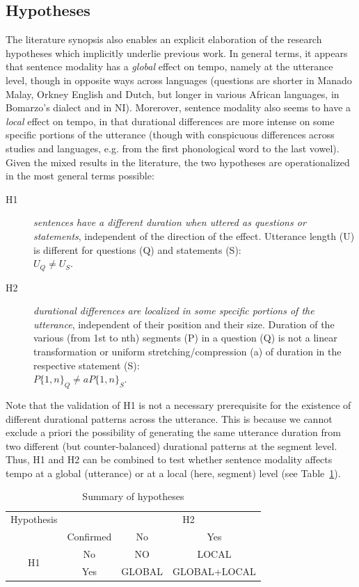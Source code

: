 \subsection{Hypotheses}\label{sec431}
The literature synopsis also enables an explicit elaboration of the research hypotheses which implicitly underlie previous work. In general terms, it appears that sentence modality has a \textit{global} effect on tempo, namely at the utterance level, though in opposite ways across languages (questions are shorter in Manado Malay, Orkney English and Dutch, but longer in various African languages, in Bomarzo's dialect and in NI). Morerover, sentence modality also seems to have a \textit{local} effect on tempo, in that durational differences are more intense on some specific portions of the utterance (though with conspicuous differences across studies and languages, e.g. from the first phonological word to the last vowel). Given the mixed results in the literature, the two hypotheses are operationalized in the most general terms possible: 

\begin{description}
   \item[H1] \textit{sentences have a different duration when uttered as questions or statements}, independent of the direction of the  effect. Utterance length (U) is different for questions (Q) and statements (S):\\ $U_{Q} \neq U_{S}$.
   \item[H2] \textit{durational differences are localized in some specific portions of the utterance}, independent of their position and their size. Duration of the various (from 1st to nth) segments (P) in a question (Q) is not a linear transformation or uniform stretching/compression (a) of duration in the respective statement (S):\\ $P\{1,n\}_{Q} \neq aP\{1,n\}_{S}$.
\end{description}

Note that the validation of H1 is not a necessary prerequisite for the existence of different durational patterns across the utterance. This is because we cannot exclude a priori the possibility of generating the same utterance duration from two different (but counter-balanced) durational patterns at the segment level. Thus, H1 and H2 can be combined to test whether sentence modality affects tempo at a global (utterance) or at a local (here, segment) level (see Table~\ref{tab42}).

\begin{table}[h]
\centering
\begin{tabular}{c c | c c}
Hypothesis & & \multicolumn{2}{c}{H2}\\
& Confirmed & No & Yes\\
\hline
\multirow{2}{*}{H1} & No & NO & LOCAL\\
 & Yes & GLOBAL & GLOBAL+LOCAL\\
\end{tabular}
\caption{Summary of hypotheses}
\label{tab42}\end{table}

